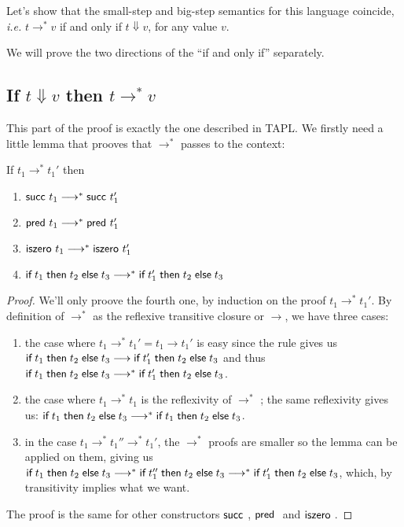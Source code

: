 Let's show that the small-step and big-step semantics for this language
coincide, {\em i.e.} $t \rightarrow^* v$ if and only if $t \Downarrow v$, for
any value $v$.

We will prove the two directions of the ``if and only if'' separately.

\subsection{If $t \Downarrow v$ then $t \rightarrow^* v$}

This part of the proof is exactly the one described in TAPL. We firstly need a
little lemma that prooves that $\longrightarrow^*$ passes to the context:

\begin{lemma}[A.6]
  If $t_1 \longrightarrow^* t_1'$ then
  \begin{enumerate}
    \item $\textsf{succ}~t_1 \longrightarrow^* \textsf{succ}~t_1'$
    \item $\textsf{pred}~t_1 \longrightarrow^* \textsf{pred}~t_1'$
    \item $\textsf{iszero}~t_1 \longrightarrow^* \textsf{iszero}~t_1'$
    \item $\textsf{if\;} t_1 \textsf{\;then\;} t_2 \textsf{\;else\;} t_3 \longrightarrow^* \textsf{if\;} t_1' \textsf{\;then\;} t_2 \textsf{\;else\;} t_3$
  \end{enumerate}
\end{lemma}

\begin{proof}
  We'll only proove the fourth one, by induction on the proof
  $t_1 \longrightarrow^* t_1'$. By definition of $\longrightarrow^*$ as the
  reflexive transitive closure or $\longrightarrow$, we have three cases:
  \begin{enumerate}
    \item the case where $t_1 \longrightarrow^* t_1' = t_1 \longrightarrow t_1'$
      is easy since the \EIf rule gives us $\textsf{if\;} t_1 \textsf{\;then\;} t_2 \textsf{\;else\;} t_3
      \longrightarrow \textsf{if\;} t_1' \textsf{\;then\;} t_2 \textsf{\;else\;} t_3$ and thus $\textsf{if\;} t_1 \textsf{\;then\;} t_2 \textsf{\;else\;} t_3
      \longrightarrow^* \textsf{if\;} t_1' \textsf{\;then\;} t_2 \textsf{\;else\;} t_3$.
      
    \item the case where $t_1 \longrightarrow^* t_1$ is the reflexivity of
      $\longrightarrow^*$ ; the same reflexivity gives us:
      $\textsf{if\;} t_1 \textsf{\;then\;} t_2 \textsf{\;else\;} t_3 \longrightarrow^* \textsf{if\;} t_1 \textsf{\;then\;} t_2 \textsf{\;else\;} t_3$.
    
    \item in the case $t_1 \longrightarrow^* t_1'' \longrightarrow^* t_1'$,
      the $\longrightarrow^*$ proofs are smaller so the lemma can be applied on
      them, giving us $\textsf{if\;} t_1 \textsf{\;then\;} t_2 \textsf{\;else\;} t_3 \longrightarrow^*
      \textsf{if\;} t_1'' \textsf{\;then\;} t_2 \textsf{\;else\;} t_3 \longrightarrow^* \textsf{if\;} t_1' \textsf{\;then\;} t_2 \textsf{\;else\;} t_3$, which,
      by transitivity implies what we want.
  \end{enumerate}
  The proof is the same for other constructors $\tmsucc$, $\tmpred$ and
  $\tmiszero$.
\end{proof}

